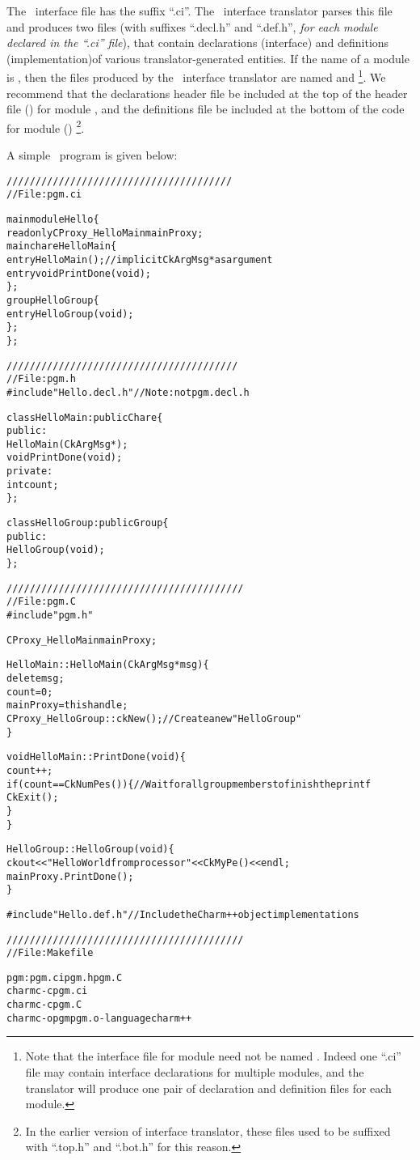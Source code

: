 The \charmpp\ interface file has the suffix ``.ci''.  The \charmpp\ interface
translator parses this file and produces two files (with suffixes ``.decl.h''
and ``.def.h'', {\em for each module declared in the ``.ci'' file}), that
contain declarations (interface) and definitions (implementation)of various
translator-generated entities. If the name of a module is , then the
files produced by the \charmpp\ interface translator are named 
and \footnote{Note that the interface file for module 
need not be named . Indeed one ``.ci'' file may contain interface
declarations for multiple modules, and the translator will produce one pair of
declaration and definition files for each module.}.  We recommend that the
declarations header file be included at the top of the header file ()
for module , and the definitions file be included at the bottom of the
code for module () \footnote{In the earlier version of interface
translator, these files used to be suffixed with ``.top.h'' and ``.bot.h'' for
this reason.}.

A simple \charmpp\ program is given below:

\begin{alltt}
///////////////////////////////////////
// File: pgm.ci

mainmodule Hello \{
  readonly CProxy_HelloMain mainProxy;
  mainchare HelloMain \{
    entry HelloMain(); // implicit CkArgMsg * as argument
    entry void PrintDone(void);
  \};
  group HelloGroup \{
    entry HelloGroup(void);
  \};
\};

////////////////////////////////////////
// File: pgm.h
#include "Hello.decl.h" // Note: not pgm.decl.h

class HelloMain: public Chare \{
  public:
    HelloMain(CkArgMsg *);
    void PrintDone(void);
  private:
    int count;
\};

class HelloGroup: public Group \{
  public:
    HelloGroup(void);
\};

/////////////////////////////////////////
// File: pgm.C
#include "pgm.h"

CProxy_HelloMain mainProxy;

HelloMain::HelloMain(CkArgMsg *msg) \{
  delete msg;
  count = 0;
  mainProxy=thishandle;
  CProxy_HelloGroup::ckNew(); // Create a new "HelloGroup"
\}

void HelloMain::PrintDone(void) \{
  count++;
  if (count == CkNumPes()) \{ // Wait for all group members to finish the printf
    CkExit();
  \}
\}

HelloGroup::HelloGroup(void) \{
  ckout << "Hello World from processor " << CkMyPe() << endl;
  mainProxy.PrintDone();
\}

#include "Hello.def.h" // Include the Charm++ object implementations

/////////////////////////////////////////
// File: Makefile

pgm: pgm.ci pgm.h pgm.C
      charmc -c pgm.ci
      charmc -c pgm.C
      charmc -o pgm pgm.o -language charm++

\end{alltt}

